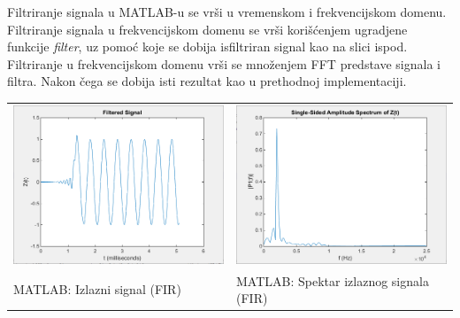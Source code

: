 \documentclass[a4paper,12pt, projekat]{etf}
\begin{document}
Filtriranje signala u MATLAB-u se vr\v{s}i u vremenskom i frekvencijskom domenu. Filtriranje signala
u frekvencijskom domenu se vr\v{s}i kori\v{s}\'{c}enjem ugradjene funkcije \textit{filter}, uz pomo\'{c}
koje se dobija isfiltriran signal kao na slici ispod. Filtriranje u frekvencijskom domenu vr\v{s}i
se mno\v{z}enjem FFT predstave signala i filtra. Nakon \v{c}ega se dobija isti rezultat kao u
prethodnoj implementaciji.

\begin{table}[h!]
	\begin{tabular}{ll}
		\includegraphics[scale=0.4]{matlab_filtered.png} &
		\includegraphics[scale=0.4]{matlab_filtered_fft.png} \\
		MATLAB: Izlazni signal (FIR) &
		MATLAB: Spektar izlaznog signala (FIR)
	\end{tabular}
\end{table}
\end{document}
